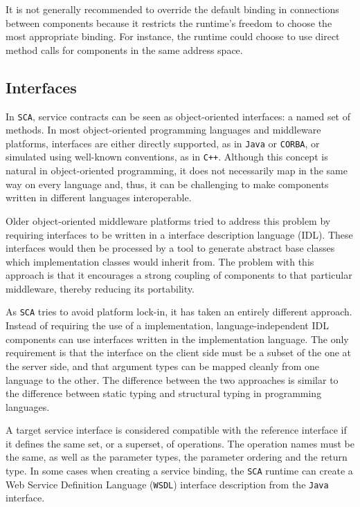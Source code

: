 It is not generally recommended to override the default binding in connections between components because it restricts
the runtime's freedom to choose the most appropriate binding. For instance, the runtime could choose to use direct method
calls for components in the same address space.

\subsection{Interfaces}
In \texttt{SCA}, service contracts can be seen as object-oriented interfaces: a named set of methods. In most object-oriented programming
languages and middleware platforms, interfaces are either directly supported, as in \texttt{Java} or \texttt{CORBA}, or simulated using well-known
conventions, as in \texttt{C++}. Although this concept is natural in object-oriented programming, it does not necessarily map in the same
way on every language and, thus, it can be challenging to make components written in different languages interoperable.

Older object-oriented middleware platforms tried to address this problem by requiring interfaces to be written in a
interface description language (IDL). These interfaces would then be processed by a tool to generate abstract base classes
which implementation classes would inherit from. The problem with this approach is that it encourages a strong coupling
of components to that particular middleware, thereby reducing its portability.

As \texttt{SCA} tries to avoid platform lock-in, it has taken an entirely different approach. Instead of requiring the use
of a implementation, language-independent IDL components can use interfaces written in the implementation language.
The only requirement is that the interface on the client side must be a subset of the one at the server side, and that
argument types can be mapped cleanly from one language to the other. The difference between the two approaches is
similar to the difference between static typing and structural typing in programming languages.

A target service interface is considered compatible with the reference interface if it defines the same set, or a superset,
of operations. The operation names must be the same, as well as the parameter types, the parameter ordering and the return
type.
In some cases when creating a service binding, the \texttt{SCA} runtime can create a Web Service Definition Language (\texttt{WSDL}) interface description from the \texttt{Java} interface.


